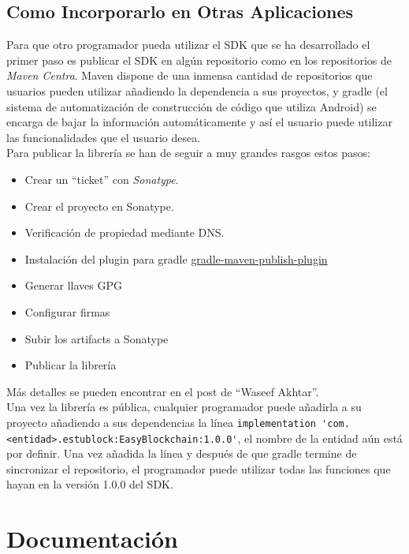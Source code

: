 \subsection{Como Incorporarlo en Otras Aplicaciones} \label{sec:Maven}

Para que otro programador pueda utilizar el SDK que se ha desarrollado el primer paso es publicar el SDK en algún repositorio como en los repositorios de \emph{Maven Centra}\cite{maven}. Maven dispone de una inmensa cantidad de repositorios que usuarios pueden utilizar añadiendo la dependencia a sus proyectos, y gradle (el sistema de automatización de construcción de código que utiliza Android) se encarga de bajar la información automáticamente y así el usuario puede utilizar las funcionalidades que el usuario desea. \\

Para publicar la librería se han de seguir a muy grandes rasgos estos pasos:
\begin{itemize}
\item Crear un ``ticket'' con \emph{Sonatype}\cite{sonatype}.
\item Crear el proyecto en Sonatype.
\item Verificación de propiedad mediante DNS.
\item Instalación del plugin para gradle \href{https://github.com/vanniktech/gradle-maven-publish-plugin}{gradle-maven-publish-plugin}
\item Generar llaves GPG
\item Configurar firmas
\item Subir los artifacts a Sonatype
\item Publicar la librería
\end{itemize}

Más detalles se pueden encontrar en el post de ``Waseef Akhtar''\cite{waseef}. \\

Una vez la librería es pública, cualquier programador puede añadirla a su proyecto añadiendo a sus dependencias la línea \verb|implementation 'com.<entidad>.estublock:EasyBlockchain:1.0.0'|, el nombre de la entidad aún está por definir. Una vez añadida la línea y después de que gradle termine de sincronizar el repositorio, el programador puede utilizar todas las funciones que hayan en la versión 1.0.0 del SDK.


\section{Documentación}

